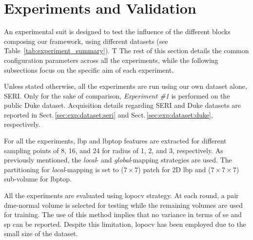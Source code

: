 
\section{Experiments and Validation}
\label{sec:exp} \label{sec:exp:datasets}
An experimental suit is designed to test the influence of the different blocks composing our framework, using different datasets (see Table~\ref{tab:experiment_summary}).
T%
The rest of this section details the common configuration parameters across all the experiments, while the following subsections focus on the specific aim of each experiment.

Unless stated otherwise, all the experiments are run using our own dataset alone, SERI.
Only for the sake of comparison, \emph{Experiment \#1} is performed on the public Duke dataset.
Acquisition details regarding SERI and Duke datasets are reported in Sect.\,\ref{sec:exp:dataset:seri} and Sect.\,\ref{sec:exp:dataset:duke}, respectively.

For all the experiments, \ac{lbp} and \ac{lbptop} features are extracted for different sampling points of 8, 16, and 24 for radius of 1, 2, and 3, respectively.
As previously mentioned, the \emph{local}- and \emph{global}-mapping strategies are used.
The partitioning for \emph{local}-mapping is set to ($7 \times 7$) patch for 2D \ac{lbp} and ($ 7 \times 7 \times 7$) sub-volume for \ac{lbptop}.

All the experiments are evaluated using \ac{lopocv} strategy.
At each round, a pair \ac{dme}-normal volume is selected for testing while the remaining volumes are used for training.
The use of this method implies that no variance in terms of \acf{se} and \acf{sp} can be reported.
Despite this limitation, \ac{lopocv} has been employed due to the small size of the dataset.


